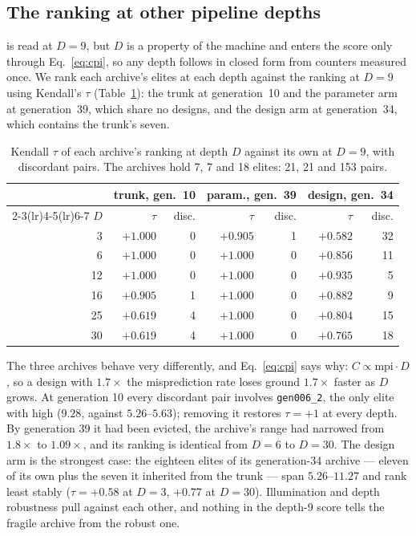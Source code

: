 \documentclass[conference]{IEEEtran}
\newcommand{\vfs}{\text{VFS}}
\newcommand{\mpki}{\text{MPKI}}
\begin{document}
\subsection{The ranking at other pipeline depths}
\label{sec:depth}

\vfs{} is read at $D=9$, but $D$ is a property of the machine and enters the
score only through Eq.~\eqref{eq:cpi}, so any depth follows in closed form from
counters measured once. We rank each archive's elites at each depth against the
ranking at $D=9$ using Kendall's $\tau$ (Table~\ref{tab:tau}): the trunk at
generation~10 and the parameter arm at generation~39, which share no designs,
and the design arm at generation~34, which contains the trunk's seven.

\begin{table}[tb]
\caption{Kendall $\tau$ of each archive's ranking at depth $D$ against its own
at $D=9$, with discordant pairs. The archives hold 7, 7 and 18 elites: 21, 21
and 153 pairs.}
\label{tab:tau}
\centering\scriptsize
\begin{tabular}{@{}rrrrrrr@{}}
\toprule
& \multicolumn{2}{c}{trunk, gen.\ 10} & \multicolumn{2}{c}{param., gen.\ 39}
& \multicolumn{2}{c}{design, gen.\ 34} \\
\cmidrule(lr){2-3}\cmidrule(lr){4-5}\cmidrule(lr){6-7}
$D$ & $\tau$ & disc. & $\tau$ & disc. & $\tau$ & disc. \\
\midrule
3  & $+1.000$ & 0 & $+0.905$ & 1 & $+0.582$ & 32 \\
6  & $+1.000$ & 0 & $+1.000$ & 0 & $+0.856$ & 11 \\
12 & $+1.000$ & 0 & $+1.000$ & 0 & $+0.935$ &  5 \\
16 & $+0.905$ & 1 & $+1.000$ & 0 & $+0.882$ &  9 \\
25 & $+0.619$ & 4 & $+1.000$ & 0 & $+0.804$ & 15 \\
30 & $+0.619$ & 4 & $+1.000$ & 0 & $+0.765$ & 18 \\
\bottomrule
\end{tabular}
\end{table}

The three archives behave very differently, and Eq.~\eqref{eq:cpi} says why:
$C\propto\text{mpi}\cdot D$, so a design with $1.7\times$ the misprediction rate
loses ground $1.7\times$ faster as $D$ grows. At generation 10 every discordant
pair involves \texttt{gen006\_2}, the only elite with high \mpki{} ($9.28$,
against $5.26$--$5.63$); removing it restores $\tau=+1$ at every depth. By
generation 39 it had been evicted, the archive's \mpki{} range had narrowed from
$1.8\times$ to $1.09\times$, and its ranking is identical from $D=6$ to $D=30$.
The design arm is the strongest case: the eighteen elites of its generation-34
archive --- eleven of its own plus the seven it inherited from the trunk ---
span \mpki{} $5.26$--$11.27$ and rank least stably ($\tau=+0.58$ at $D=3$, $+0.77$ at
$D=30$). Illumination and depth robustness pull against each other, and nothing
in the depth-9 score tells the fragile archive from the robust one.
\end{document}
